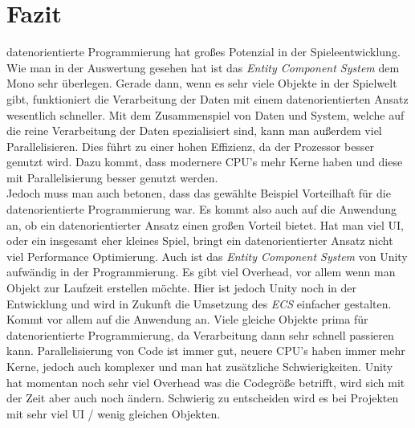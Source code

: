\section{Fazit}
datenorientierte Programmierung hat großes Potenzial in der Spieleentwicklung. Wie man in der Auswertung gesehen hat ist das \textit{Entity Component System} dem Mono sehr überlegen. Gerade dann, wenn es sehr viele Objekte in der Spielwelt gibt, funktioniert die Verarbeitung der Daten mit einem datenorientierten Ansatz wesentlich schneller. Mit dem Zusammenspiel von Daten und System, welche auf die reine Verarbeitung der Daten spezialisiert sind, kann man außerdem viel Parallelisieren. Dies führt zu einer hohen Effizienz, da der Prozessor besser genutzt wird. Dazu kommt, dass modernere CPU's mehr Kerne haben und diese mit Parallelisierung besser genutzt werden.\\
Jedoch muss man auch betonen, dass das gewählte Beispiel Vorteilhaft für die datenorientierte Programmierung war. Es kommt also auch auf die Anwendung an, ob ein datenorientierter Ansatz einen großen Vorteil bietet. Hat man viel UI, oder ein insgesamt eher kleines Spiel, bringt ein datenorientierter Ansatz nicht viel Performance Optimierung. Auch ist das \textit{Entity Component System} von Unity aufwändig in der Programmierung. Es gibt viel Overhead, vor allem wenn man Objekt zur Laufzeit erstellen möchte. Hier ist jedoch Unity noch in der Entwicklung und wird in Zukunft die Umsetzung des \textit{ECS} einfacher gestalten.\\
Kommt vor allem auf die Anwendung an. Viele gleiche Objekte prima für datenorientierte Programmierung, da Verarbeitung dann sehr schnell passieren kann. Parallelisierung von Code ist immer gut, neuere CPU's haben immer mehr Kerne, jedoch auch komplexer und man hat zusätzliche Schwierigkeiten. Unity hat momentan noch sehr viel Overhead was die Codegröße betrifft, wird sich mit der Zeit aber auch noch ändern. Schwierig zu entscheiden wird es bei Projekten mit sehr viel UI / wenig gleichen Objekten.